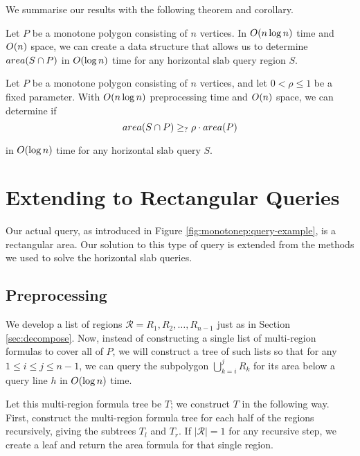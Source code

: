 \noindent
We summarise our results with the following theorem and corollary.

\begin{theorem}
\label{th:montonep:slab-area}
Let $P$ be a monotone polygon consisting of $n$ vertices. In $O\!\left(n \log{n}\right)$ time and $O\!\left(n\right)$ space, we can create a data structure that allows us to determine $area(S \cap P)$ in $O\!\left(\log{n}\right)$ time for any horizontal slab query region $S$.
\end{theorem}

\begin{corollary}
\label{cor:montonep:slab-mp}
Let $P$ be a monotone polygon consisting of $n$ vertices, and let $0 < \rho \leq 1$ be a fixed parameter. With $O\!\left(n \log{n}\right)$ preprocessing time and $O\!\left(n\right)$ space, we can determine if 
\[ 
area(S \cap P) \geq_{?} \rho \cdot area(P)
\] 

\noindent in $O\!\left(\log{n}\right)$ time for any horizontal slab query $S$.
\end{corollary}


\section{Extending to Rectangular Queries}
\label{:monotonep:rect}

Our actual query, as introduced in Figure \ref{fig:monotonep:query-example}, is a rectangular area. Our solution to this type of query is extended from the methods we used to solve the horizontal slab queries.

\subsection{Preprocessing}
\label{:monotonep:rect:pre}

We develop a list of regions $\mathcal{R} = R_1, R_2, \ldots, R_{n-1}$ just as in Section \ref{sec:decompose}.  Now, instead of constructing a single list of multi-region formulas to cover all of $P$, we will construct a tree of such lists so that for any $1 \leq i \leq j \leq n-1$, we can query the subpolygon $\bigcup_{k=i}^{j}{R_k}$ for its area below a query line $h$ in $O\!\left(\log{n}\right)$ time.

Let this multi-region formula tree be $T$; we construct $T$ in the following way. First, construct the multi-region formula tree for each half of the regions recursively, giving the subtrees $T_l$ and $T_r$. If $|\mathcal{R}| = 1$ for any recursive step, we create a leaf and return the area formula for that single region.

